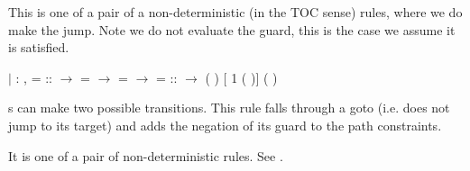 \documentclass[12pt]{report}
\begin{document}
          This is one of a pair of a non-deterministic
          (in the TOC sense) rules, where we do make the
          jump. Note we do not evaluate the guard, this is
          the case we assume it is satisfied.


           
\begin{coqdoccode}
\coqdocindent{3.00em}
\ensuremath{|}  : \coqdockw{\ensuremath{\forall}}            ,\coqdoceol
\coqdocindent{5.00em}
  =    ::  \ensuremath{\rightarrow}\coqdoceol
\coqdocindent{5.00em}
 =    \ensuremath{\rightarrow}\coqdoceol
\coqdocindent{5.00em}
   =   \ensuremath{\rightarrow}\coqdoceol
\coqdocindent{5.00em}
 =  ::  \ensuremath{\rightarrow}\coqdoceol
\coqdocindent{5.00em}
 \coqdoceol
\coqdocindent{6.00em}
(        ) [ 1 (  )]\coqdoceol
\coqdocindent{6.00em}
(      )\coqdoceol
\coqdocnoindent
\coqdoceol
\coqdocindent{3.00em}
\end{coqdoccode}
s can make two possible transitions.
          This rule falls through a goto (i.e. does not jump to
          its target) and adds the negation of its guard to the
          path constraints.


          It is one of a pair of non-deterministic rules.
          See .
\end{document}
